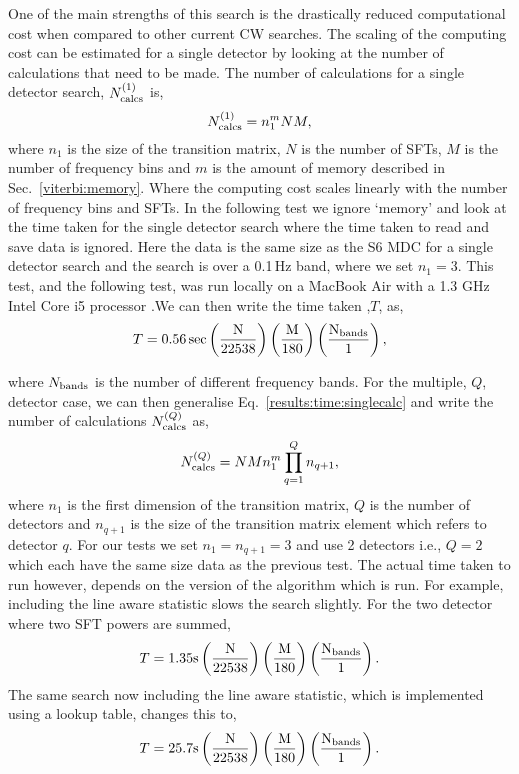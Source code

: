 One of the main strengths of this search is the drastically reduced computational cost when compared to other current \ac{CW} searches.
The scaling of the computing cost can be estimated for a single detector by looking at the number of calculations that need to be made. 
The number of calculations for a single detector search, $N^{(1)}_{\rm{calcs}}$ is,
\begin{equation}
\label{results:time:singlecalc}
N^{(1)}_{\rm{calcs}} = n_{1}^{m}NM,
\end{equation}
where $n_1$ is the size of the transition matrix, $N$ is the number of \acp{SFT}, $M$ is the number of frequency bins and $m$ is the amount of memory described in Sec.~\ref{viterbi:memory}. Where the computing cost scales linearly with the number of frequency bins and \acp{SFT}.
In the following test we ignore `memory' and look at the time taken for the single detector search where the time taken to read and save data is ignored. Here the data is the same size as the S6 \ac{MDC} for a single detector search and the search is over a 0.1\,Hz band, where we set $n_1=3$. This test, and the following test, was run locally on a MacBook Air with a 1.3 GHz Intel Core i5 processor .We can then write the time taken ,$T$, as,
%
\begin{equation}
T = 0.56\,\rm{sec}\left( \frac{N}{22538}\right) \left( \frac{M}{180}\right) \left( \frac{N_{\rm{bands}}}{1}\right),
\end{equation}

where  $N_{\rm{bands}}$ is the number of different frequency
bands.
For the multiple, $Q$, detector case, we can then generalise Eq.~\ref{results:time:singlecalc} and write the number of calculations $N^{(Q)}_{\rm{calcs}}$ as,
\begin{equation}
\label{results:time:numbercalcs}
N^{(Q)}_{\rm{calcs}} = NMn_{1}^{m} \prod_{q=1}^{Q}n_{q+1},
\end{equation}
where $n_1$ is the first dimension of the transition matrix, $Q$ is the number of detectors and $n_{q+1}$ is the size of the transition matrix element which refers to detector $q$.
For our tests we set $n_1=n_{q+1}=3$ and use 2 detectors i.e., $Q=2$ which each have the same size data as the previous test. The actual time taken to run however, depends on the version of the algorithm which is run. For example, including the line aware statistic slows the search slightly.
For the two detector where two \ac{SFT} powers are summed,
\begin{equation}
T = 1.35 \rm{s}\left( \frac{N}{22538}\right) \left( \frac{M}{180}\right) \left( \frac{N_{\rm{bands}}}{1}\right).
\end{equation}
The same search now including the line aware statistic, which is implemented using a lookup table, changes this to,
\begin{equation}
T = 25.7 \rm{s}\left( \frac{N}{22538}\right) \left( \frac{M}{180}\right) \left( \frac{N_{\rm{bands}}}{1}\right).
\end{equation}

